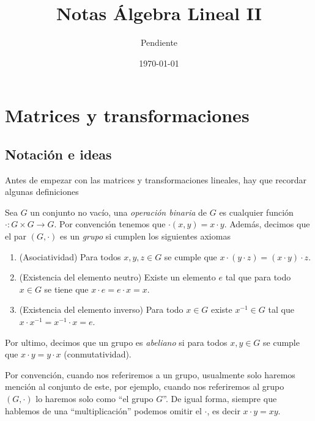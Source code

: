 \documentclass[11pt]{report}
\title{Notas Álgebra Lineal II}
\author{Pendiente}
\date{\today}
\begin{document}
\maketitle

\chapter{Matrices y transformaciones}

\section{Notación e ideas}

Antes de empezar con las matrices y transformaciones lineales, hay que recordar algunas definiciones

\begin{defi}
  Sea $G$ un conjunto no vacío, una \emph{operación binaria} de $G$ es cualquier función $\cdot \colon G \times G \to G$. Por convención tenemos que $\cdot(x,y) = x \cdot y$. Además, decimos que el par $(G, \cdot)$ es un \emph{grupo} si cumplen los siguientes axiomas
  \begin{enumerate}
    \item (Asociatividad) Para todos $x, y, z \in G$ se cumple que $x\cdot(y\cdot z) = (x\cdot y)\cdot z$.
    \item (Existencia del elemento neutro) Existe un elemento $e$ tal que para todo $x \in G$ se tiene que $x\cdot e = e\cdot x = x$.
    \item (Existencia del elemento inverso) Para todo $x \in G$ existe $x^{-1} \in G$ tal que $x\cdot x^{-1} = x^{-1}\cdot x = e$.
  \end{enumerate}

  Por ultimo, decimos que un grupo es \emph{abeliano} si para todos $x, y \in G$ se cumple que $x\cdot y = y\cdot x$ (conmutatividad).
\end{defi}

Por convención, cuando nos referiremos a un grupo, usualmente solo haremos mención al conjunto de este, por ejemplo, cuando nos referiremos al grupo $(G, \cdot)$ lo haremos solo como ``el grupo $G$''. De igual forma, siempre que hablemos de una ``multiplicación'' podemos omitir el $\cdot$, es decir $x \cdot y = xy$.
\end{document}
